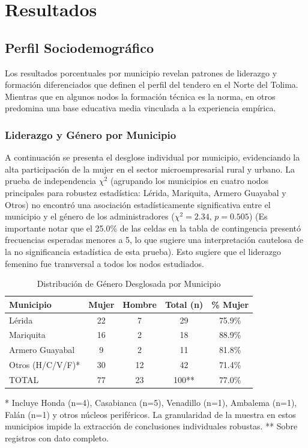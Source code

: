 \documentclass[11pt,a4paper]{article}
\begin{document}
\newpage
\section{Resultados}

\subsection{Perfil Sociodemogr\'afico}
Los resultados porcentuales por municipio revelan patrones de liderazgo y formación diferenciados que definen el perfil del tendero en el Norte del Tolima. Mientras que en algunos nodos la formación técnica es la norma, en otros predomina una base educativa media vinculada a la experiencia empírica.

\subsubsection{Liderazgo y G\'enero por Municipio}
A continuación se presenta el desglose individual por municipio, evidenciando la alta participación de la mujer en el sector microempresarial rural y urbano. La prueba de independencia $\chi^{2}$ (agrupando los municipios en cuatro nodos principales para robustez estadística: Lérida, Mariquita, Armero Guayabal y Otros) no encontró una asociación estadísticamente significativa entre el municipio y el género de los administradores ($\chi^{2} = 2.34$, $p = 0.505$) (Es importante notar que el 25.0\% de las celdas en la tabla de contingencia presentó frecuencias esperadas menores a 5, lo que sugiere una interpretación cautelosa de la no significancia estadística de esta prueba). Esto sugiere que el liderazgo femenino fue transversal a todos los nodos estudiados.

\begin{table}[H]
\centering
\caption{Distribución de Género Desglosada por Municipio}
\small
\begin{tabular}{@{}lcccc@{}}
\toprule
Municipio         & Mujer   & Hombre  & Total (n) & \% Mujer \\ \midrule
Lérida             & 22       & 7        & 29      & 75.9\% \\
Mariquita          & 16       & 2        & 18      & 88.9\% \\
Armero Guayabal     & 9       & 2        & 11      & 81.8\% \\
Otros (H/C/V/F)*              & 30       & 12       & 42      & 71.4\% \\ \midrule
TOTAL              & 77       & 23     & 100**   & 77.0\% \\ \bottomrule
\end{tabular}
\par\smallskip
\footnotesize{* Incluye Honda (n=4), Casabianca (n=5), Venadillo (n=1), Ambalema (n=1), Falán (n=1) y otros núcleos periféricos. La granularidad de la muestra en estos municipios impide la extracción de conclusiones individuales robustas. ** Sobre registros con dato completo.}
\end{table}
\end{document}
